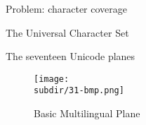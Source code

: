 \documentclass[../index.tex]{subfiles}
\begin{document}
\renewcommand{\currenttitle}{Problem: character coverage}
\begin{frame}[standout]
  Problem: character coverage
\end{frame}

\renewcommand{\currenttitle}{The Universal Character Set}
\begin{frame}{\currenttitle}
%
%
%
\end{frame}

\renewcommand{\currenttitle}{The seventeen Unicode planes}
\begin{frame}{\currenttitle}
%
%
%
  \vspace*{1em}
  \begin{figure}
    \centering
    \texttt{[image: \\subdir/31-bmp.png]}
    \caption{Basic Multilingual Plane}
  \end{figure}
\end{frame}
\end{document}

